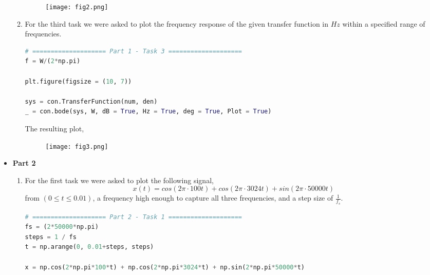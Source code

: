 \documentclass[12pt,a4paper]{article}
\begin{document}
\begin{itemize}
\begin{enumerate}
\begin{figure}[h]
    \centering
    \texttt{[image: fig2.png]}
\end{figure}\textbf{}
\clearpage

    \item
    For the third task we were asked to plot the frequency response of the given transfer function in $Hz$ within a specified range of frequencies.\\

\begin{lstlisting}[language=Python, caption={Task 3, Part 1}, label={lst:code}, mathescape=true, breaklines=true]
# ==================== Part 1 - Task 3 ====================
f = W/(2*np.pi)

plt.figure(figsize = (10, 7))

sys = con.TransferFunction(num, den)
_ = con.bode(sys, W, dB = True, Hz = True, deg = True, Plot = True)
\end{lstlisting}

The resulting plot,

\begin{figure}[h]
    \centering
    \texttt{[image: fig3.png]}
\end{figure}\textbf{}
\clearpage
\end{enumerate}

\item \textbf{Part 2}\\
\begin{enumerate}

    \item
    For the first task we were asked to plot the following signal, 
    $$x(t) = cos(2\pi \cdot 100t) + cos(2\pi \cdot 3024t) + sin(2\pi \cdot 50000t)$$
    from $(0 \leq t \leq 0.01)$, a frequency high enough to capture all three frequencies, and a step size of $\frac{1}{f_s}$.\\

\begin{lstlisting}[language=Python, caption={Task 1, Part 2}, label={lst:code}, mathescape=true, breaklines=true]
# ==================== Part 2 - Task 1 ====================
fs = (2*50000*np.pi)
steps = 1 / fs
t = np.arange(0, 0.01+steps, steps)

x = np.cos(2*np.pi*100*t) + np.cos(2*np.pi*3024*t) + np.sin(2*np.pi*50000*t)
\end{lstlisting}


\end{enumerate}
\end{itemize}
\end{document}
